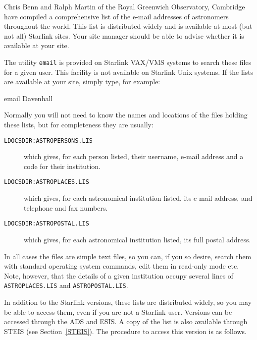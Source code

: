 \documentclass[twoside,11pt,nolof]{starlink}
\begin{document}
Chris Benn and Ralph Martin of the Royal Greenwich Observatory,
Cambridge have compiled a comprehensive list of the e-mail addresses of
astronomers throughout the world. This list is distributed widely and
is available at most (but not all) Starlink sites. Your site manager
should be able to advise whether it is available at your site.

The utility \texttt{email} is provided on Starlink VAX/VMS systems to
search these files for a given user. This facility is not available on
Starlink Unix systems. If the lists are available at your site, simply
type, for example:

\begin{terminalv}
email  Davenhall
\end{terminalv}

Normally you will not need to know the names and locations of the files
holding these lists, but for completeness they are usually:

\begin{description}

  \item[\texttt{LDOCSDIR:ASTROPERSONS.LIS }] which gives, for each person
   listed, their username, e-mail address and a code for their
   institution.

  \item[\texttt{LDOCSDIR:ASTROPLACES.LIS }] which gives, for each
   astronomical institution listed, its e-mail address, and telephone
   and fax numbers.

  \item[\texttt{LDOCSDIR:ASTROPOSTAL.LIS }] which gives, for each
   astronomical institution listed, its full postal address.

\end{description}

In all cases the files are simple text files, so you can, if you so
desire, search them with standard operating system commands, edit them
in read-only mode etc. Note, however, that the details of a given
institution occupy several lines of \texttt{ASTROPLACES.LIS} and \texttt{ASTROPOSTAL.LIS}.

In addition to the Starlink versions, these lists are distributed
widely, so you may be able to access them, even if you are not a
Starlink user. Versions can be accessed through the ADS and ESIS.
A copy of the list is also available through STEIS (see
Section~\ref{STEIS}). The procedure to access this version is as
follows.
\end{document}
